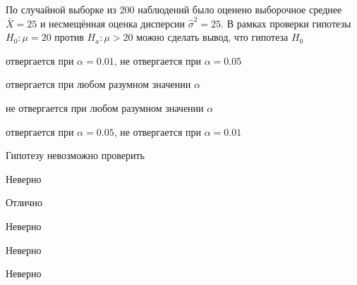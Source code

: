 
\begin{question}
По случайной выборке из 200 наблюдений было оценено выборочное среднее
\(\bar{X} = 25\) и несмещённая оценка дисперсии \(\hat{\sigma}^2 = 25\).
В рамках проверки гипотезы \(H_0: \mu = 20\) против \(H_a: \mu > 20\)
можно сделать вывод, что гипотеза \(H_0\)
\begin{answerlist}
  \item отвергается при \(\alpha = 0.01\), не отвергается при \(\alpha = 0.05\)
  \item отвергается при любом разумном значении \(\alpha\)
  \item не отвергается при любом разумном значении \(\alpha\)
  \item отвергается при \(\alpha = 0.05\), не отвергается при \(\alpha = 0.01\)
  \item Гипотезу невозможно проверить
\end{answerlist}
\end{question}

\begin{solution}
\begin{answerlist}
  \item Неверно
  \item Отлично
  \item Неверно
  \item Неверно
  \item Неверно
\end{answerlist}
\end{solution}

